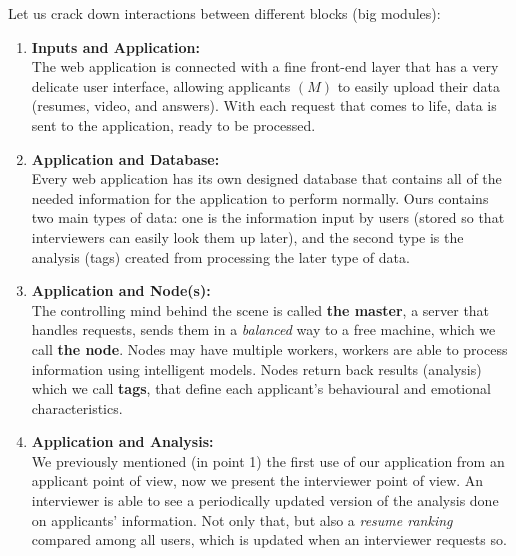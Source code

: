 Let us crack down interactions between different blocks (big modules):
\begin{enumerate}
    \item \textbf{Inputs and Application:}\\
    The web application is connected with a fine front-end layer that has a very delicate user interface, allowing applicants $(M)$ to easily upload their data (resumes, video, and answers). With each request that comes to life, data is sent to the application, ready to be processed.
    
    \item \textbf{Application and Database:}\\
    Every web application has its own designed database that contains all of the needed information for the application to perform normally. Ours contains two main types of data: one is the information input by users (stored so that interviewers can easily look them up later), and the second type is the analysis (tags) created from processing the later type of data.
    
    \item \textbf{Application and Node(s):}\\
    The controlling mind behind the scene is called \textbf{the master}, a server that handles requests, sends them in a \textit{balanced} way to a free machine, which we call \textbf{the node}. Nodes may have multiple workers, workers are able to process information using intelligent models. Nodes return back results (analysis) which we call \textbf{tags}, that define each applicant's behavioural and emotional characteristics.
    
    \item \textbf{Application and Analysis:}\\
    We previously mentioned (in point 1) the first use of our application from an applicant point of view, now we present the interviewer point of view. An interviewer is able to see a periodically updated version of the analysis done on applicants' information. Not only that, but also a \textit{resume ranking} compared among all users, which is updated when an interviewer requests so.
    
    
\end{enumerate}


